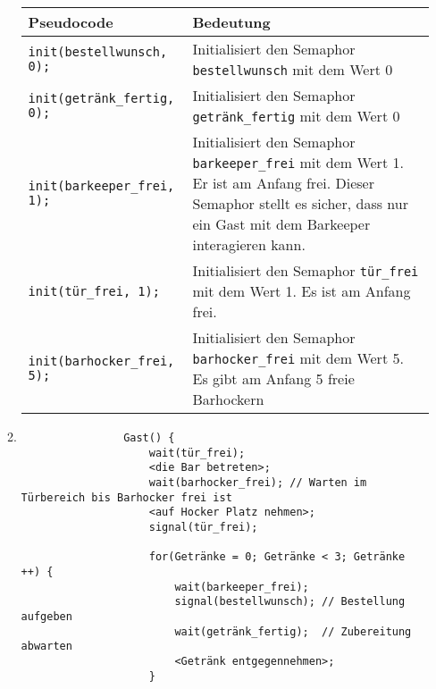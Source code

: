 \begin{enumerate}[label={Aufgabe H\arabic*},start=45]
\begin{enumerate}
\begin{center}
\begin{tabularx}{0.85\textwidth}{p{4.5cm}X}
                        \toprule
                        Pseudocode & Bedeutung \\
                        \midrule
                        \texttt{init(bestellwunsch, 0);} & Initialisiert den Semaphor \texttt{bestellwunsch} mit dem Wert 0 \\
                        \texttt{init(getränk\_fertig, 0);} & Initialisiert den Semaphor \texttt{getränk\_fertig} mit dem Wert 0 \\
                        \texttt{init(barkeeper\_frei, 1);} & Initialisiert den Semaphor \texttt{barkeeper\_frei} mit dem Wert 1. Er ist am Anfang frei. Dieser Semaphor stellt es sicher, dass nur ein Gast mit dem Barkeeper interagieren kann.\\
                        \texttt{init(tür\_frei, 1);} & Initialisiert den Semaphor \texttt{tür\_frei} mit dem Wert 1. Es ist am Anfang frei. \\
                        \texttt{init(barhocker\_frei, 5);} & Initialisiert den Semaphor \texttt{barhocker\_frei} mit dem Wert 5. Es gibt am Anfang 5 freie Barhockern\\
                        \bottomrule
                    \end{tabularx}
                \end{center}
            \pagebreak[4]
            \item \blanko 
                \vspace{\baselineskip}

                \begin{verbatim}
                Gast() {
                    wait(tür_frei);
                    <die Bar betreten>;
                    wait(barhocker_frei); // Warten im Türbereich bis Barhocker frei ist
                    <auf Hocker Platz nehmen>;
                    signal(tür_frei);

                    for(Getränke = 0; Getränke < 3; Getränke ++) {
                        wait(barkeeper_frei);
                        signal(bestellwunsch); // Bestellung aufgeben
                        wait(getränk_fertig);  // Zubereitung abwarten
                        <Getränk entgegennehmen>;
                    }


\end{verbatim}
\end{enumerate}
\end{enumerate}
